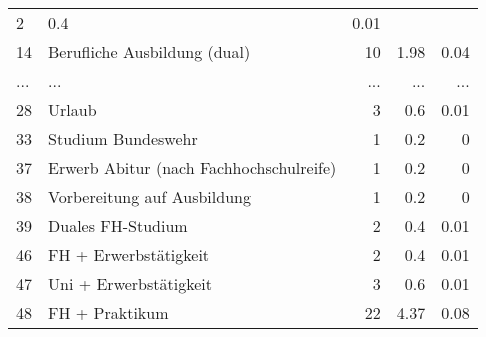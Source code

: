\begin{longtable}{lXrrr}
          \num{2} &
          \num[round-mode=places,round-precision=2]{0.4} &
          \num[round-mode=places,round-precision=2]{0.01} \\
        14 & \multicolumn{1}{X}{Berufliche Ausbildung (dual)} & %
          \num{10} &
          \num[round-mode=places,round-precision=2]{1.98} &
          \num[round-mode=places,round-precision=2]{0.04} \\
       ... & ... & ... & ... & ... \\
        28 & \multicolumn{1}{X}{Urlaub} & %
          \num{3} &
          \num[round-mode=places,round-precision=2]{0.6} &
          \num[round-mode=places,round-precision=2]{0.01} \\

        33 & \multicolumn{1}{X}{Studium Bundeswehr} & %
          \num{1} &
          \num[round-mode=places,round-precision=2]{0.2} &
          \num[round-mode=places,round-precision=2]{0} \\

        37 & \multicolumn{1}{X}{Erwerb Abitur (nach Fachhochschulreife)} & %
          \num{1} &
          \num[round-mode=places,round-precision=2]{0.2} &
          \num[round-mode=places,round-precision=2]{0} \\

        38 & \multicolumn{1}{X}{Vorbereitung auf Ausbildung} & %
          \num{1} &
          \num[round-mode=places,round-precision=2]{0.2} &
          \num[round-mode=places,round-precision=2]{0} \\

        39 & \multicolumn{1}{X}{Duales FH-Studium} & %
          \num{2} &
          \num[round-mode=places,round-precision=2]{0.4} &
          \num[round-mode=places,round-precision=2]{0.01} \\

        46 & \multicolumn{1}{X}{FH + Erwerbstätigkeit} & %
          \num{2} &
          \num[round-mode=places,round-precision=2]{0.4} &
          \num[round-mode=places,round-precision=2]{0.01} \\

        47 & \multicolumn{1}{X}{Uni + Erwerbstätigkeit} & %
          \num{3} &
          \num[round-mode=places,round-precision=2]{0.6} &
          \num[round-mode=places,round-precision=2]{0.01} \\

        48 & \multicolumn{1}{X}{FH + Praktikum} & %
          \num{22} &
          \num[round-mode=places,round-precision=2]{4.37} &
          \num[round-mode=places,round-precision=2]{0.08} \\


\end{longtable}

